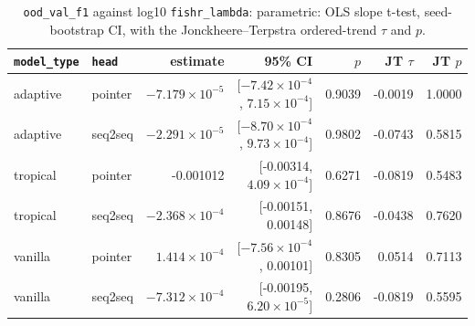 \documentclass[10pt]{article}
\begin{document}
{\small
\begin{longtable}{llrrrrr}
\caption{\texttt{ood\_val\_f1} against log10 \texttt{fishr\_lambda}: parametric: OLS slope t-test, seed-bootstrap CI, with the Jonckheere--Terpstra ordered-trend $\tau$ and $p$.}\label{tab:trend-ood_val_f1}\\
\toprule
\texttt{model\_type} & \texttt{head} & estimate & 95\% CI & $p$ & JT $\tau$ & JT $p$\\
\midrule
\endhead
adaptive & pointer & $-7.179\times10^{-5}$ & [$-7.42\times10^{-4}$, $7.15\times10^{-4}$] & 0.9039 & -0.0019 & 1.0000\\
adaptive & seq2seq & $-2.291\times10^{-5}$ & [$-8.70\times10^{-4}$, $9.73\times10^{-4}$] & 0.9802 & -0.0743 & 0.5815\\
tropical & pointer & -0.001012 & [-0.00314, $4.09\times10^{-4}$] & 0.6271 & -0.0819 & 0.5483\\
tropical & seq2seq & $-2.368\times10^{-4}$ & [-0.00151, 0.00148] & 0.8676 & -0.0438 & 0.7620\\
vanilla & pointer & $1.414\times10^{-4}$ & [$-7.56\times10^{-4}$, 0.00101] & 0.8305 & 0.0514 & 0.7113\\
vanilla & seq2seq & $-7.312\times10^{-4}$ & [-0.00195, $6.20\times10^{-5}$] & 0.2806 & -0.0819 & 0.5595\\
\bottomrule
\end{longtable}
}
\end{document}
